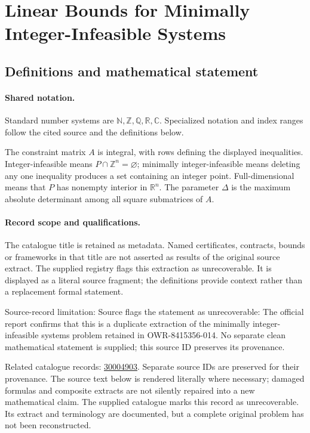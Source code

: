 \documentclass[11pt]{article}
\begin{document}
\section{Linear Bounds for Minimally Integer-Infeasible Systems}\label{statement}

\subsection{Definitions and mathematical statement}

\paragraph{Shared notation.}Standard number systems are $\mathbb N,\mathbb Z,\mathbb Q,\mathbb R,\mathbb C$. Specialized notation and index ranges follow the cited source and the definitions below.


The constraint matrix $A$ is integral, with rows defining the displayed inequalities. Integer-infeasible means $P\cap\mathbb Z^n=\varnothing$; minimally integer-infeasible means deleting any one inequality produces a set containing an integer point. Full-dimensional means that $P$ has nonempty interior in $\mathbb R^n$. The parameter $\Delta$ is the maximum absolute determinant among all square submatrices of $A$.
\paragraph{Record scope and qualifications.}
The catalogue title is retained as metadata. Named certificates, contracts, bounds or frameworks in that title are not asserted as results of the original source extract.
The supplied registry flags this extraction as unrecoverable. It is displayed as a literal source fragment; the definitions provide context rather than a replacement formal statement.

Source-record limitation: Source flags the statement as unrecoverable: The official report confirms that this is a duplicate extraction of the minimally integer-infeasible systems problem retained in OWR-8415356-014. No separate clean mathematical statement is supplied; this source ID preserves its provenance.

Related catalogue records: \href{https://mehmetmars7.github.io/Erdosproblems-llm-hunter/problem.html?type=open_problems&id=30004903}{30004903}. Separate source IDs are preserved for their provenance.
The source text below is rendered literally where necessary; damaged formulas and composite extracts are not silently repaired into a new mathematical claim.
The supplied catalogue marks this record as unrecoverable. Its extract and terminology are documented, but a complete original problem has not been reconstructed.
\end{document}
